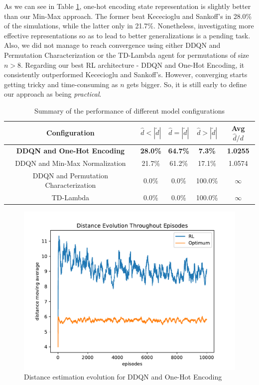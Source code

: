 \documentclass[11pt,twoside]{article}
\begin{document}
As we can see in Table \ref{table:results}, one-hot encoding state representation is slightly better than our Min-Max approach. The former beat Kececioglu and Sankoff's in 28.0\% of the simulations, while the latter only in 21.7\%. Nonetheless, investigating more effective representations so as to lead to better generalizations is a pending task. Also, we did not manage to reach convergence using either DDQN and Permutation Characterization or the TD-Lambda agent for permutations of size $n > 8$. Regarding our best RL architecture - DDQN and One-Hot Encoding, it consistently outperformed Kececioglu and Sankoff's. However, converging starts getting tricky and time-consuming as $n$ gets bigger. So, it is still early to define our approach as being \textit{practical}.

\begin{table}[H]
	\begin{center}
		\begin{tabular}{|c|c|c|c|c|}
			\hline
			Configuration & $\hat{d} < |\widetilde{d}|$ & $\hat{d} = |\widetilde{d}|$ & $\hat{d} > |\widetilde{d}|$ & Avg $\hat{d}/d$\\
			\hline\hline
			\textbf{DDQN and One-Hot Encoding} & \textbf{28.0\%} & \textbf{64.7\%} & \textbf{7.3\%} & \textbf{1.0255}\\
			DDQN and Min-Max Normalization & 21.7\% & 61.2\% & 17.1\% & 1.0574\\
			DDQN and Permutation Characterization & 0.0\% & 0.0\% & 100.0\% & $\infty$\\
			TD-Lambda & 0.0\% & 0.0\% & 100.0\% & $\infty$\\
			\hline
		\end{tabular}
		\caption{Summary of the performance of different model configurations}
	\label{table:results}
	\end{center}
\end{table}


\begin{figure}[H]
	\begin{center}
		\includegraphics[scale=0.8]{charts/dist_evolution.pdf}
		\caption{Distance estimation evolution for DDQN and One-Hot Encoding}
		\label{chart:dist_evolution}
	\end{center}
\end{figure}
\end{document}
